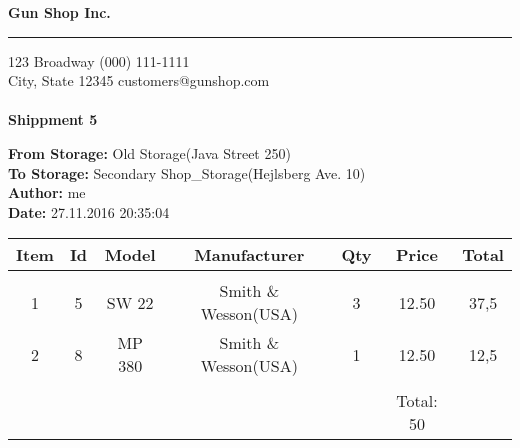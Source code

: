 \documentclass{article}
\begin{document}
\hfil{\Huge\bf Gun Shop Inc.}\hfil
\bigskip
\hrule
\bigskip

123 Broadway \hfill (000) 111-1111 \\
City, State 12345 \hfill customers@gunshop.com\\ \\

\hfill{\bf Shippment 5}\hfill
\bigskip

{\bf From Storage:}   Old Storage(Java Street 250)\\
{\bf To Storage:}  Secondary Shop\_Storage(Hejlsberg Ave. 10) \\
{\bf Author:}  me \\ 
{\bf Date:}  27.11.2016 20:35:04 \\
\begin{center}
\begin{tabular}{ c c c c c c c }
  Item & Id & Model & Manufacturer & Qty & Price & Total  \\[2ex]
\hline\\
 1 & 5 & SW 22& Smith \& Wesson(USA)& 3 & 12.50 & 37,5 \\ [2ex] 2 & 8 & MP 380& Smith \& Wesson(USA)& 1 & 12.50 & 12,5 \\ [2ex]\hline\\&&&&&Total: 50&\end{tabular}\end{center}
\end{document}
